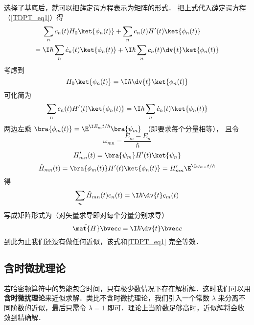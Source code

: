选择了基底后，就可以把薛定谔方程表示为矩阵的形式． %
把上式代入薛定谔方程（\autoref{TDPT_eq1}）得
\begin{equation}
\begin{aligned}
&\sum_n c_n(t) H_0 \ket{\phi_n(t)} + \sum_n c_n(t) H'(t) \ket{\phi_n(t)} \\ 
={} &\I\hbar \sum_n \dot c_n(t) \ket{\phi_n(t)}
+ \I\hbar \sum_n c_n(t) \dv{t} \ket{\phi_n(t)}
\end{aligned}
\end{equation}
考虑到
\begin{equation}
H_0\ket{\phi_n(t)} = \I\hbar \dv{t} \ket{\phi_n(t)}
\end{equation}
可化简为
\begin{equation}
\sum_n c_n(t) H'(t) \ket{\phi_n(t)}
= \I\hbar \sum_n \dot c_n(t) \ket{\phi_n(t)}
\end{equation}
两边左乘 $\bra{\phi_m(t)} = \E^{\I E_m t/\hbar}\bra{\psi_m}$ （即要求每个分量相等）， 且令
\begin{equation}
\omega_{mn} = \frac{E_m-E_n}{\hbar}
\end{equation}
\begin{equation}
H'_{mn}(t) = \bra{\psi_m} H'(t)\ket{\psi_n}
\end{equation}
\begin{equation}\label{TDPT_eq7}
\tilde H_{mn}(t) = \bra{\phi_m(t)} H'(t) \ket{\phi_n(t)} = H'_{mn} \E^{\I\omega_{mn}t/\hbar}
\end{equation}
得
\begin{equation}\label{TDPT_eq2}
\sum_n \tilde H_{mn}(t) c_n(t)
= \I\hbar \dv{t} c_m(t)
\end{equation}
写成矩阵形式为（对矢量求导即对每个分量分别求导）
\begin{equation}\label{TDPT_eq3}
\tilde{\mat {H}} \bvec c = \I\hbar \dv{t} \bvec c
\end{equation}
到此为止我们还没有做任何近似，该式和\autoref{TDPT_eq1} 完全等效．

\subsection{含时微扰理论}
若哈密顿算符中的势能包含时间，只有极少数情况下存在解析解．这时我们可以用\textbf{含时微扰理论}来近似求解．类比不含时微扰理论，我们引入一个常数 $\lambda$ 来分离不同阶数的近似，最后只需令 $\lambda = 1$ 即可．理论上当阶数足够高时，近似解将会收敛到精确解．%

